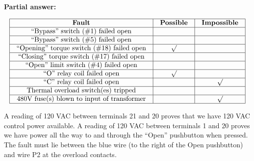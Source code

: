 





\noindent
{\bf Partial answer:}


$$\vbox{\offinterlineskip
\halign{\strut
\vrule \quad\hfil # \ \hfil & 
\vrule \quad\hfil # \ \hfil & 
\vrule \quad\hfil # \ \hfil \vrule \cr
\noalign{\hrule}
%
{\bf Fault} & {\bf Possible} & {\bf Impossible} \cr
%
\noalign{\hrule}
%
``Bypass'' switch (\#1) failed open &  &  \cr
%
\noalign{\hrule}
%
``Bypass'' switch (\#5) failed open &  &  \cr
%
\noalign{\hrule}
%
``Opening'' torque switch (\#18) failed open & $\surd$ &  \cr
%
\noalign{\hrule}
%
``Closing'' torque switch (\#17) failed open &  &  \cr
%
\noalign{\hrule}
%
``Open'' limit switch (\#4) failed open &  &  \cr
%
\noalign{\hrule}
%
``O'' relay coil failed open & $\surd$ &  \cr
%
\noalign{\hrule}
%
``C'' relay coil failed open &  & $\surd$ \cr
%
\noalign{\hrule}
%
Thermal overload switch(es) tripped &  &  \cr
%
\noalign{\hrule}
%
480V fuse(s) blown to input of transformer &  & $\surd$ \cr
%
\noalign{\hrule}
} %
}$$ %







A reading of 120 VAC between terminals 21 and 20 proves that we have 120 VAC control power available.  A reading of 120 VAC between terminals 1 and 20 proves we have power all the way to and through the ``Open'' pushbutton when pressed.  The fault must lie between the blue wire (to the right of the Open pushbutton) and wire P2 at the overload contacts.



